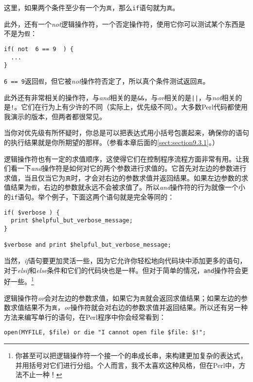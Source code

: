 这里，如果两个条件至少有一个为\verb|真|，那么\verb|if|语句就为\verb|真|。

此外，还有一个\textit{not}逻辑操作符，一个否定操作符，使用它你可以测试某个东西是不是为\verb|假|：

\begin{lstlisting}
if( not  6 == 9  ) {
  ...
}
\end{lstlisting}

\verb|6 == 9|返回\verb|假|，但它被\textit{not}操作符否定了，所以真个条件测试返回\verb|真|。

此外还有非常相关的操作符，与\textit{and}相关的是\verb=&&=，与\textit{or}相关的是\verb=||=，与\textit{not}相关的是\verb=!=。它们在行为上有少许的不同（实际上，优先级不同）。大多数Perl代码都使用我演示的版本，但两者都很常见。

当你对优先级有所怀疑时，你总是可以把表达式用小括号包裹起来，确保你的语句的执行结果就是你所期望的那样。（参看本章后面的\autoref{sect:section9.3.1}。）

逻辑操作符也有一定的求值顺序，这使得它们在控制程序流程方面非常有用。让我们看一下\textit{and}操作符是如何对它的两个参数进行求值的。它首先对左边的参数进行求值，当且仅当它为\verb|真|时，才会对右边的参数求值并返回结果。如果左边参数的求值结果为\verb|假|，右边的参数就永远不会被求值了。所以\textit{and}操作符的行为就像一个小的\verb|if|语句。举个例子，下面这两个语句就是完全等同的：

\begin{lstlisting}
if( $verbose ) {
  print $helpful_but_verbose_message;
}

$verbose and print $helpful_but_verbose_message;
\end{lstlisting}

当然，\textit{if}语句要更加灵活一些，因为它允许你轻松地向代码块中添加更多的语句，对于\textit{elsif}和\textit{else}条件和它们的代码块也是一样。但对于简单的情况，\verb|and|操作符会更好一些。\footnote{你甚至可以把逻辑操作符一个接一个的串成长串，来构建更加复杂的表达式，并用括号对它们进行分组。个人而言，我不太喜欢这种风格，但在Perl中，方法不止一种！}

逻辑操作符\textit{or}会对左边的参数求值，如果它为\verb|真|就会返回求值结果；如果左边的参数求值结果不为\verb|真|，\textit{or}操作符就会对右边的参数求值并返回结果。所以还有另一种方法来编写单行的语句，在Perl程序中你会经常看到：

\begin{lstlisting}
open(MYFILE, $file) or die "I cannot open file $file: $!";
\end{lstlisting}


